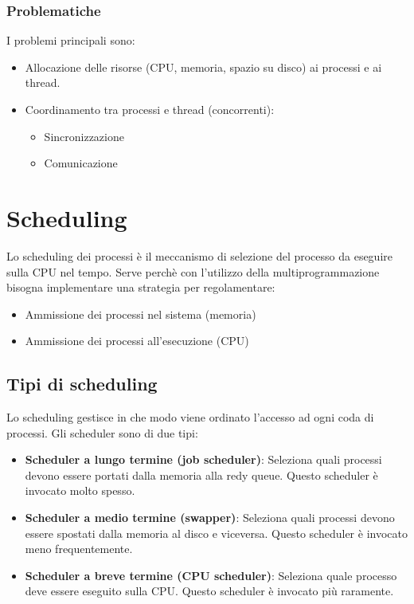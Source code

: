 \documentclass[a4paper]{article}
\begin{document}
\subsubsection{Problematiche}
I problemi principali sono:
\begin{itemize}
  \item Allocazione delle risorse (CPU, memoria, spazio su disco) ai
    processi e ai thread.
  \item Coordinamento tra processi e thread (concorrenti):
    \begin{itemize}
      \item Sincronizzazione
      \item Comunicazione
    \end{itemize}
\end{itemize}

\section{Scheduling}
Lo scheduling dei processi è il meccanismo di selezione del processo da eseguire
sulla CPU nel tempo. Serve perchè con l'utilizzo della multiprogrammazione bisogna
implementare una strategia per regolamentare:
\begin{itemize}
  \item Ammissione dei processi nel sistema (memoria)
  \item Ammissione dei processi all'esecuzione (CPU)
\end{itemize}

\subsection{Tipi di scheduling}
Lo scheduling gestisce in che modo viene ordinato l'accesso ad ogni coda di processi.
Gli scheduler sono di due tipi:
\begin{itemize}
  \item \textbf{Scheduler a lungo termine (job scheduler)}: Seleziona quali processi 
    devono essere portati dalla memoria alla redy queue. Questo scheduler è invocato
    molto spesso.
  \item \textbf{Scheduler a medio termine (swapper)}: Seleziona quali processi
    devono essere spostati dalla memoria al disco e viceversa. Questo scheduler è
    invocato meno frequentemente.
  \item \textbf{Scheduler a breve termine (CPU scheduler)}: Seleziona quale processo
    deve essere eseguito sulla CPU. Questo scheduler è invocato più raramente.
\end{itemize}
\end{document}
